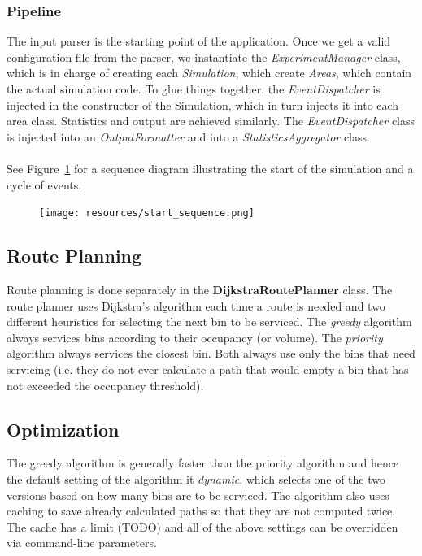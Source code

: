 \documentclass{article}
\begin{document}
		\subsubsection{Pipeline}
		The input parser is the starting point of the application. Once we get a valid configuration file from the parser, we instantiate the
		\textit{ExperimentManager} class, which is in charge of creating each \textit{Simulation}, which create \textit{Areas}, which contain the actual
		simulation code. To glue things together, the \textit{EventDispatcher} is injected in the constructor of the Simulation, which in turn 
		injects it into each area class. Statistics and output are achieved similarly. The \textit{EventDispatcher} class is injected into an
		\textit{OutputFormatter} and into a \textit{StatisticsAggregator} class.
			\\
			\\
			See Figure~\ref{fig:fig2} for a sequence diagram illustrating the start of the simulation and a cycle of events.

		\begin{figure}[H]
		\centering
			\texttt{[image: resources/start\_sequence.png]}
			\label{fig:fig2} 
		\end{figure}

	\subsection{Route Planning}
	Route planning is done separately in the \textbf{DijkstraRoutePlanner} class. The route planner uses Dijkstra's algorithm each time
	a route is needed and two different heuristics for selecting the next bin to be serviced. The \textit{greedy} algorithm always services
	bins according to their occupancy (or volume). The \textit{priority} algorithm always services the closest bin. Both always use only the bins
	that need servicing (i.e. they do not ever calculate a path that would empty a bin that has not exceeded the occupancy threshold).

	\subsection{Optimization}
		The greedy algorithm is generally faster than the priority algorithm and hence the default setting of the algorithm it \textit{dynamic}, which
		selects one of the two versions based on how many bins are to be serviced. The algorithm also uses caching to save already calculated paths
		so that they are not computed twice. The cache has a limit (TODO) and all of the above settings can be overridden via command-line parameters.
		
\end{document}
